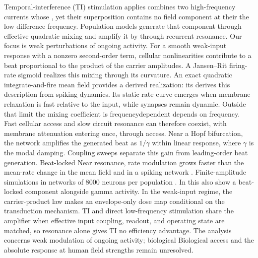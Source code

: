 \documentclass[11pt,a4paper]{article}
\providecommand{\DIFaddtex}[1]{{\protect\color{blue} \sf #1}} %
\providecommand{\DIFdeltex}[1]{{\protect\color{red} \scriptsize #1}} %
\providecommand{\DIFaddbegin}{} %
\providecommand{\DIFaddend}{} %
\providecommand{\DIFdelbegin}{} %
\providecommand{\DIFdelend}{} %
\providecommand{\DIFadd}[1]{\texorpdfstring{\DIFaddtex{#1}}{#1}} %
\providecommand{\DIFdel}[1]{\texorpdfstring{\DIFdeltex{#1}}{}} %
\begin{document}
\else
\noindent
Temporal-interference (TI) stimulation \DIFdelbegin \DIFdel{applies }\DIFdelend \DIFaddbegin \DIFadd{combines }\DIFaddend two high-frequency currents\DIFdelbegin \DIFdel{whose
}\DIFdelend \DIFaddbegin \DIFadd{, yet their
}\DIFaddend superposition contains no field component at \DIFdelbegin \DIFdel{their }\DIFdelend \DIFaddbegin \DIFadd{the }\DIFaddend low difference frequency. Population
models generate that component through effective quadratic mixing and amplify it \DIFdelbegin \DIFdel{by
}\DIFdelend \DIFaddbegin \DIFadd{through
}\DIFaddend recurrent resonance. \DIFaddbegin \DIFadd{Our focus is weak perturbations of ongoing activity. }\DIFaddend For a smooth
\DIFdelbegin \DIFdel{weak-input }\DIFdelend response with a nonzero second-order term,
cellular nonlinearities contribute to a beat proportional to the product of the carrier
amplitudes. A Jansen--Rit firing-rate sigmoid realizes this mixing through its curvature.
An exact quadratic integrate-and-fire mean field \DIFdelbegin \DIFdel{provides a derived realization: its
}\DIFdelend \DIFaddbegin \DIFadd{derives this description from spiking
dynamics. Its }\DIFaddend static rate curve emerges when membrane relaxation is fast relative to the
input, while synapses remain dynamic. Outside that limit the mixing coefficient \DIFdelbegin \DIFdel{is frequencydependent}\DIFdelend \DIFaddbegin \DIFadd{depends
on frequency}\DIFaddend . Fast cellular access and slow circuit resonance can therefore coexist, with
membrane attenuation entering once, through access. Near a Hopf bifurcation, the network amplifies the
generated beat as $1/\gamma$ within linear response, where $\gamma$ is the modal damping.
Coupling sweeps separate this gain from leading-order beat generation. \DIFdelbegin \DIFdel{Beat-locked }\DIFdelend \DIFaddbegin \DIFadd{Near resonance,
}\DIFaddend rate modulation grows faster than the mean-rate change\DIFdelbegin \DIFdel{in the mean field and in a spiking
network }\DIFdelend \DIFaddbegin \DIFadd{. Finite-amplitude simulations in
networks }\DIFaddend of $8000$ neurons per population \DIFdelbegin \DIFdel{. In this }\DIFdelend \DIFaddbegin \DIFadd{also show a beat-locked component alongside gamma
activity. In the }\DIFaddend weak-input regime, the carrier-product
law makes an envelope-only dose map conditional on the transduction mechanism. TI and
direct low-frequency stimulation share the amplifier when effective input coupling,
readout, and operating state are matched, so resonance alone gives TI no efficiency
advantage. \DIFdelbegin \DIFdel{The analysis concerns weak modulation of
ongoing activity; biological }\DIFdelend \DIFaddbegin \DIFadd{Biological }\DIFaddend access and the absolute response at human field strengths remain
unresolved.
\fi
\end{document}

